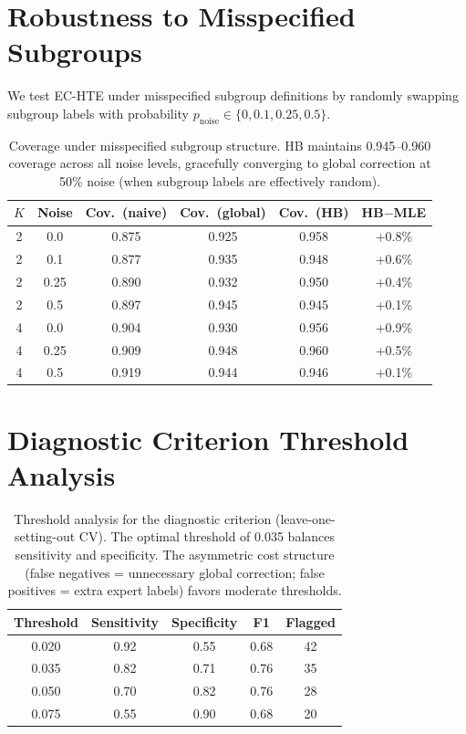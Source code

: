 \documentclass[11pt]{article}
\begin{document}
\section{Robustness to Misspecified Subgroups}
\label{app:robustness}

We test EC-HTE under misspecified subgroup definitions by randomly swapping subgroup labels with probability $p_{\text{noise}} \in \{0, 0.1, 0.25, 0.5\}$.

\begin{table}[h]
\centering
\small
\begin{tabular}{cccccc}
\toprule
$K$ & Noise & Cov.\ (naive) & Cov.\ (global) & Cov.\ (HB) & HB$-$MLE \\
\midrule
2 & 0.0 & 0.875 & 0.925 & 0.958 & +0.8\% \\
2 & 0.1 & 0.877 & 0.935 & 0.948 & +0.6\% \\
2 & 0.25 & 0.890 & 0.932 & 0.950 & +0.4\% \\
2 & 0.5 & 0.897 & 0.945 & 0.945 & +0.1\% \\
4 & 0.0 & 0.904 & 0.930 & 0.956 & +0.9\% \\
4 & 0.25 & 0.909 & 0.948 & 0.960 & +0.5\% \\
4 & 0.5 & 0.919 & 0.944 & 0.946 & +0.1\% \\
\bottomrule
\end{tabular}
\caption{Coverage under misspecified subgroup structure. HB maintains 0.945--0.960 coverage across all noise levels, gracefully converging to global correction at 50\% noise (when subgroup labels are effectively random).}
\label{tab:robustness}
\end{table}

\section{Diagnostic Criterion Threshold Analysis}
\label{app:threshold}

\begin{table}[h]
\centering
\small
\begin{tabular}{ccccc}
\toprule
Threshold & Sensitivity & Specificity & F1 & Flagged \\
\midrule
0.020 & 0.92 & 0.55 & 0.68 & 42 \\
0.035 & 0.82 & 0.71 & 0.76 & 35 \\
0.050 & 0.70 & 0.82 & 0.76 & 28 \\
0.075 & 0.55 & 0.90 & 0.68 & 20 \\
\bottomrule
\end{tabular}
\caption{Threshold analysis for the diagnostic criterion (leave-one-setting-out CV). The optimal threshold of 0.035 balances sensitivity and specificity. The asymmetric cost structure (false negatives = unnecessary global correction; false positives = extra expert labels) favors moderate thresholds.}
\label{tab:threshold}
\end{table}
\end{document}
